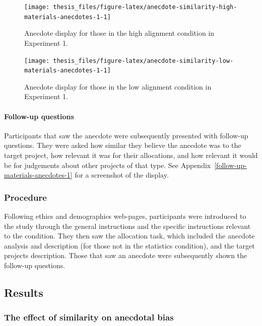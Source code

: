 \documentclass[a4paper, nobind, dvipsnames]{templates/ociamthesis}
\theoremstyle{definition}
\theoremstyle{definition}
\theoremstyle{definition}
\theoremstyle{definition}
\theoremstyle{remark}
\begin{document}
\begin{figure}
\texttt{[image: thesis\_files/figure-latex/anecdote-similarity-high-materials-anecdotes-1-1]} \caption{Anecdote display for those in the high alignment condition in Experiment 1.}\label{fig:anecdote-similarity-high-materials-anecdotes-1}
\end{figure}



\begin{figure}
\texttt{[image: thesis\_files/figure-latex/anecdote-similarity-low-materials-anecdotes-1-1]} \caption{Anecdote display for those in the low alignment condition in Experiment 1.}\label{fig:anecdote-similarity-low-materials-anecdotes-1}
\end{figure}

\paragraph{Follow-up questions}

Participants that saw the anecdote were subsequently presented with follow-up
questions. They were asked how similar they believe the anecdote was to the
target project, how relevant it was for their allocations, and how relevant it
would be for judgements about other projects of that type. See
Appendix~\ref{follow-up-materials-anecdotes-1} for a screenshot of the display.

\subsubsection{Procedure}

Following ethics and demographics web-pages, participants were introduced to the
study through the general instructions and the specific instructions relevant to
the condition. They then saw the allocation task, which included the anecdote
analysis and description (for those not in the statistics condition), and the target
projects description. Those that saw an anecdote were subsequently shown the
follow-up questions.

\hypertarget{results-anecdotes-1}{%
\subsection{Results}\label{results-anecdotes-1}}

\subsubsection{The effect of similarity on anecdotal bias}
\end{document}
